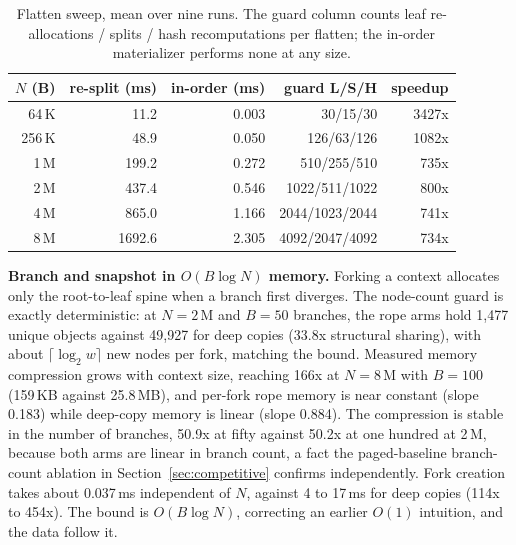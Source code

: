 \documentclass[10pt,conference]{IEEEtran}
\newcommand{\ms}{\,ms}
\begin{document}
\begin{table}[t]
\caption{Flatten sweep, mean over nine runs. The guard column counts
leaf re-allocations / splits / hash recomputations per flatten; the
in-order materializer performs none at any size.}
\label{tab:flatten}
\centering
\footnotesize
\begin{tabular}{@{}rrrrr@{}}
\toprule
$N$ (B) & re-split (ms) & in-order (ms) & guard L/S/H & speedup \\
\midrule
64\,K  & 11.2  & 0.003 & 30/15/30 & 3427x \\
256\,K & 48.9  & 0.050 & 126/63/126 & 1082x \\
1\,M   & 199.2 & 0.272 & 510/255/510 & 735x \\
2\,M   & 437.4 & 0.546 & 1022/511/1022 & 800x \\
4\,M   & 865.0 & 1.166 & 2044/1023/2044 & 741x \\
8\,M   & 1692.6 & 2.305 & 4092/2047/4092 & 734x \\
\bottomrule
\end{tabular}
\end{table}

\textbf{Branch and snapshot in $O(B\log N)$ memory.} Forking a context
allocates only the root-to-leaf spine when a branch first diverges. The
node-count guard is exactly deterministic: at $N = 2$\,M and $B = 50$
branches, the rope arms hold 1{,}477 unique objects against 49{,}927
for deep copies (33.8x structural sharing), with about
$\lceil\log_2 w\rceil$ new nodes per fork, matching the bound. Measured
memory compression grows with context size, reaching 166x at $N = 8$\,M
with $B = 100$ (159\,KB against 25.8\,MB), and per-fork rope memory is
near constant (slope 0.183) while deep-copy memory is linear (slope
0.884). The compression is stable in the number of branches, 50.9x at
fifty against 50.2x at one hundred at 2\,M, because both arms are
linear in branch count, a fact the paged-baseline branch-count
ablation in Section~\ref{sec:competitive} confirms independently.
Fork creation takes about 0.037\ms{} independent of $N$,
against 4 to 17\ms{} for deep copies (114x to 454x). The bound is
$O(B\log N)$, correcting an earlier $O(1)$ intuition, and the data
follow it.
\end{document}
